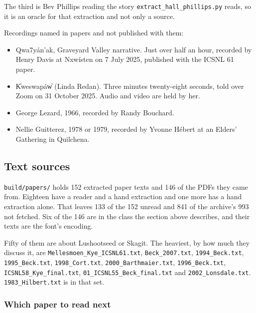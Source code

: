 The third is Bev Phillips reading the story \texttt{extract\_\allowbreak{}hall\_\allowbreak{}phillips.\allowbreak{}py} reads, so it is an oracle for that extraction and not only a source.

Recordings named in papers and not published with them:

\begin{itemize}
\item Qwa7yán'ak, Graveyard Valley narrative. Just over half an hour, recorded by Henry Davis at Nxwísten on 7 July 2025, published with the ICSNL 61 paper.
\item K̓weswapáw̓ (Linda Redan). Three minutes twenty-eight seconds, told over Zoom on 31 October 2025. Audio and video are held by her.
\item George Lezard, 1966, recorded by Randy Bouchard.
\item Nellie Guitterez, 1978 or 1979, recorded by Yvonne Hébert at an Elders' Gathering in Quilchena.
\end{itemize}

\subsection{Text sources}

\texttt{build/\allowbreak{}papers/\allowbreak{}} holds 152 extracted paper texts and 146 of the PDFs they came from. Eighteen have a reader and a hand extraction and one more has a hand extraction alone. That leaves 133 of the 152 unread and 841 of the archive's 993 not fetched. Six of the 146 are in the class the section above describes, and their texts are the font's encoding.

Fifty of them are about Lushootseed or Skagit. The heaviest, by how much they discuss it, are \texttt{Mellesmoen\_\allowbreak{}Kye\_\allowbreak{}ICSNL61.\allowbreak{}txt}, \texttt{Beck\_\allowbreak{}2007.\allowbreak{}txt}, \texttt{1994\_\allowbreak{}Beck.\allowbreak{}txt}, \texttt{1995\_\allowbreak{}Beck.\allowbreak{}txt}, \texttt{1998\_\allowbreak{}Cort.\allowbreak{}txt}, \texttt{2000\_\allowbreak{}Barthmaier.\allowbreak{}txt}, \texttt{1996\_\allowbreak{}Beck.\allowbreak{}txt}, \texttt{ICSNL58\_\allowbreak{}Kye\_\allowbreak{}final.\allowbreak{}txt}, \texttt{01\_\allowbreak{}ICSNL55\_\allowbreak{}Beck\_\allowbreak{}final.\allowbreak{}txt} and \texttt{2002\_\allowbreak{}Lonsdale.\allowbreak{}txt}. \texttt{1983\_\allowbreak{}Hilbert.\allowbreak{}txt} is in that set.

\subsubsection{Which paper to read next}

